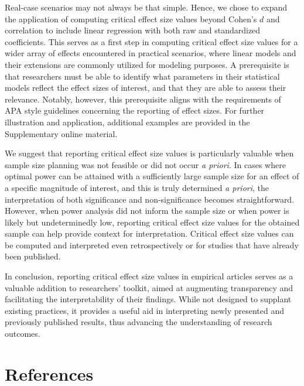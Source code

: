 \documentclass[
  man]{apa7}
\begin{document}
Real-case scenarios may not always be that simple. Hence, we chose to expand the application of computing critical effect size values beyond Cohen's \(d\) and correlation to include linear regression with both raw and standardized coefficients. This serves as a first step in computing critical effect size values for a wider array of effects encountered in practical scenarios, where linear models and their extensions are commonly utilized for modeling purposes. A prerequisite is that researchers must be able to identify what parameters in their statistical models reflect the effect sizes of interest, and that they are able to assess their relevance. Notably, however, this prerequisite aligns with the requirements of APA style guidelines concerning the reporting of effect sizes. For further illustration and application, additional examples are provided in the Supplementary online material.

We suggest that reporting critical effect size values is particularly valuable when sample size planning was not feasible or did not occur \textit{a priori}. In cases where optimal power can be attained with a sufficiently large sample size for an effect of a specific magnitude of interest, and this is truly determined \textit{a priori}, the interpretation of both significance and non-significance becomes straightforward. However, when power analysis did not inform the sample size or when power is likely but undeterminedly low, reporting critical effect size values for the obtained sample can help provide context for interpretation. Critical effect size values can be computed and interpreted even retrospectively or for studies that have already been published.

In conclusion, reporting critical effect size values in empirical articles serves as a valuable addition to researchers' toolkit, aimed at augmenting transparency and facilitating the interpretability of their findings. While not designed to supplant existing practices, it provides a useful aid in interpreting newly presented and previously published results, thus advancing the understanding of research outcomes.

\newpage

\section{References}\label{references}
\end{document}
